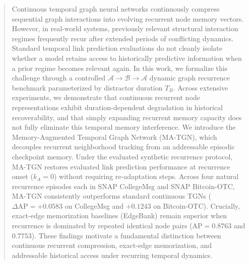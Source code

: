 \begin{abstract}
Continuous temporal graph neural networks continuously compress sequential graph interactions into evolving recurrent node memory vectors. However, in real-world systems, previously relevant structural interaction regimes frequently recur after extended periods of conflicting dynamics. Standard temporal link prediction evaluations do not cleanly isolate whether a model retains access to historically predictive information when a prior regime becomes relevant again. In this work, we formalize this challenge through a controlled $\mathcal{A} \to \mathcal{B} \to \mathcal{A}$ dynamic graph recurrence benchmark parameterized by distractor duration $T_B$. Across extensive experiments, we demonstrate that continuous recurrent node representations exhibit duration-dependent degradation in historical recoverability, and that simply expanding recurrent memory capacity does not fully eliminate this temporal memory interference. We introduce the Memory-Augmented Temporal Graph Network (MA-TGN), which decouples recurrent neighborhood tracking from an addressable episodic checkpoint memory. Under the evaluated synthetic recurrence protocol, MA-TGN restores evaluated link prediction performance at recurrence onset ($k_A=0$) without requiring re-adaptation steps. Across four natural recurrence episodes each in SNAP CollegeMsg and SNAP Bitcoin-OTC, MA-TGN consistently outperforms standard continuous TGNs ($\Delta\text{AP} = +0.0583$ on CollegeMsg and $+0.1243$ on Bitcoin-OTC). Crucially, exact-edge memorization baselines (EdgeBank) remain superior when recurrence is dominated by repeated identical node pairs ($\text{AP} = 0.8763$ and $0.7753$). These findings motivate a fundamental distinction between continuous recurrent compression, exact-edge memorization, and addressable historical access under recurring temporal dynamics.
\end{abstract}
